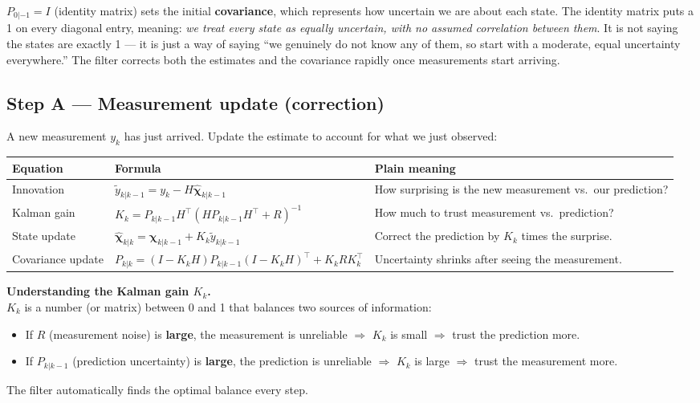 \documentclass[12pt, a4paper]{article}
\begin{document}
$P_{0|-1} = I$ (identity matrix) sets the initial \textbf{covariance},
which represents how uncertain we are about each state.
The identity matrix puts a 1 on every diagonal entry, meaning:
\emph{we treat every state as equally uncertain, with no assumed
correlation between them}.
It is not saying the states are exactly 1 --- it is just a way of
saying ``we genuinely do not know any of them, so start with a
moderate, equal uncertainty everywhere.''
The filter corrects both the estimates and the covariance rapidly
once measurements start arriving.

\subsection*{Step A --- Measurement update (correction)}

A new measurement $y_k$ has just arrived.
Update the estimate to account for what we just observed:

\begin{center}
\renewcommand{\arraystretch}{1.8}
\begin{tabular}{p{2.8cm} p{6.5cm} p{4.5cm}}
  \toprule
  \textbf{Equation} & \textbf{Formula} & \textbf{Plain meaning} \\
  \midrule
  Innovation &
    $\tilde{y}_{k|k-1} = y_k - H\hat{\boldsymbol{\chi}}_{k|k-1}$ &
    How surprising is the new measurement vs.\ our prediction? \\
  Kalman gain &
    $K_k = P_{k|k-1}H^\top\!\left(HP_{k|k-1}H^\top + R\right)^{-1}$ &
    How much to trust measurement vs.\ prediction? \\
  State update &
    $\hat{\boldsymbol{\chi}}_{k|k} = \hat{\boldsymbol{\chi}}_{k|k-1}
      + K_k\tilde{y}_{k|k-1}$ &
    Correct the prediction by $K_k$ times the surprise. \\
  Covariance update &
    $P_{k|k} = (I - K_kH)P_{k|k-1}(I-K_kH)^\top + K_kRK_k^\top$ &
    Uncertainty shrinks after seeing the measurement. \\
  \bottomrule
\end{tabular}
\end{center}

\begin{notebox}
  \textbf{Understanding the Kalman gain $K_k$.}\\
  $K_k$ is a number (or matrix) between 0 and 1 that balances two
  sources of information:
  \begin{itemize}[leftmargin=1.4em, topsep=2pt]
    \item If $R$ (measurement noise) is \textbf{large}, the measurement
          is unreliable $\Rightarrow$ $K_k$ is small $\Rightarrow$
          trust the prediction more.
    \item If $P_{k|k-1}$ (prediction uncertainty) is \textbf{large},
          the prediction is unreliable $\Rightarrow$ $K_k$ is large
          $\Rightarrow$ trust the measurement more.
  \end{itemize}
  The filter automatically finds the optimal balance every step.
\end{notebox}
\end{document}
